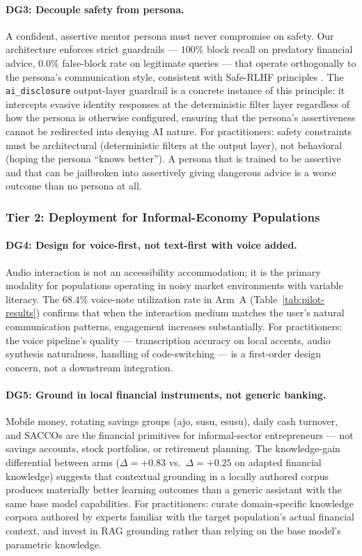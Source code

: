 \paragraph{DG3: Decouple safety from persona.}
A confident, assertive mentor persona must never compromise on safety. Our architecture enforces strict guardrails --- $100\%$ block recall on predatory financial advice, $0.0\%$ false-block rate on legitimate queries --- that operate orthogonally to the persona's communication style, consistent with Safe-RLHF principles \citep{dai2023saferlhf}. The \texttt{ai\_disclosure} output-layer guardrail is a concrete instance of this principle: it intercepts evasive identity responses at the deterministic filter layer regardless of how the persona is otherwise configured, ensuring that the persona's assertiveness cannot be redirected into denying AI nature. For practitioners: safety constraints must be architectural (deterministic filters at the output layer), not behavioral (hoping the persona ``knows better''). A persona that is trained to be assertive and that can be jailbroken into assertively giving dangerous advice is a worse outcome than no persona at all.

\subsubsection{Tier 2: Deployment for Informal-Economy Populations}

\paragraph{DG4: Design for voice-first, not text-first with voice added.}
Audio interaction is not an accessibility accommodation; it is the primary modality for populations operating in noisy market environments with variable literacy. The $68.4\%$ voice-note utilization rate in Arm~A (Table~\ref{tab:pilot-results}) confirms that when the interaction medium matches the user's natural communication patterns, engagement increases substantially. For practitioners: the voice pipeline's quality --- transcription accuracy on local accents, audio synthesis naturalness, handling of code-switching --- is a first-order design concern, not a downstream integration.

\paragraph{DG5: Ground in local financial instruments, not generic banking.}
Mobile money, rotating savings groups (ajo, susu, esusu), daily cash turnover, and SACCOs are the financial primitives for informal-sector entrepreneurs --- not savings accounts, stock portfolios, or retirement planning. The knowledge-gain differential between arms ($\Delta = +0.83$ vs.\ $\Delta = +0.25$ on adapted financial knowledge) suggests that contextual grounding in a locally authored corpus produces materially better learning outcomes than a generic assistant with the same base model capabilities. For practitioners: curate domain-specific knowledge corpora authored by experts familiar with the target population's actual financial context, and invest in RAG grounding rather than relying on the base model's parametric knowledge.

